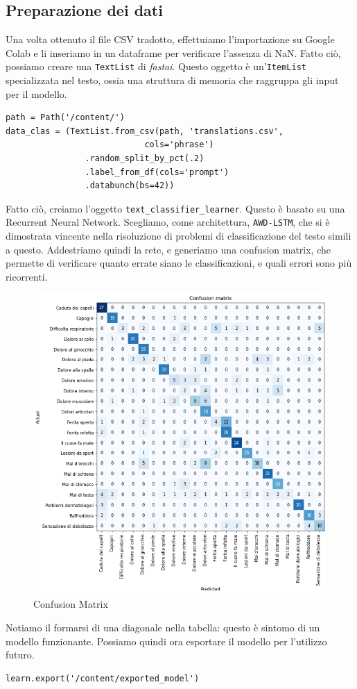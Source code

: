 \subsection{Preparazione dei dati}
Una volta ottenuto il file CSV tradotto, effettuiamo l'importazione su Google Colab e li inseriamo in un dataframe per verificare l'assenza di NaN. Fatto ciò, possiamo creare una \texttt{TextList} di \textit{fastai}. Questo oggetto è un'\texttt{ItemList} specializzata nel testo, ossia una struttura di memoria che raggruppa gli input per il modello.
\begin{verbatim}
path = Path('/content/')
data_clas = (TextList.from_csv(path, 'translations.csv', 
                            cols='phrase')
                .random_split_by_pct(.2)
                .label_from_df(cols='prompt')
                .databunch(bs=42))
\end{verbatim}
Fatto ciò, creiamo l'oggetto \texttt{text\_classifier\_learner}. Questo è basato su una Recurrent Neural Network. Scegliamo, come architettura, \texttt{AWD-LSTM}, che si è dimostrata vincente nella risoluzione di problemi di classificazione del testo simili a questo. %
Addestriamo quindi la rete, e generiamo una confusion matrix, che permette di verificare quanto errate siano le classificazioni, e quali errori sono più ricorrenti.
\begin{figure}[H]
    \begin{center}
        \includegraphics[width=0.8\columnwidth]{images/fallback/ConfusionMatrix.png}
    \end{center}
    \caption{Confusion Matrix}
    \label{fig:confusion-matrix}
\end{figure}
Notiamo il formarsi di una diagonale nella tabella: questo è sintomo di un modello funzionante. Possiamo quindi ora esportare il modello per l'utilizzo futuro.
\begin{verbatim}
learn.export('/content/exported_model')
\end{verbatim}
